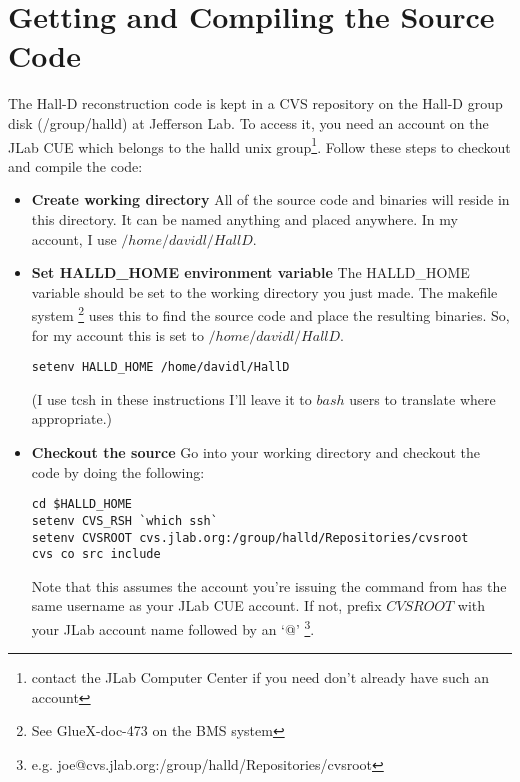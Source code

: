 \documentclass[12pt]{article}
\begin{document}
\section{Getting and Compiling the Source Code}
The Hall-D reconstruction code is kept in a CVS repository on the 
Hall-D group disk (/group/halld) at Jefferson Lab. To access it,
you need an account on the JLab CUE which belongs to the halld unix
group\footnote{contact the JLab Computer Center if you need don't
already have such an account}. Follow these steps to checkout and compile
the code:

\begin{itemize}
	\item{\bf Create working directory} All of the source code and binaries
	will reside in this directory. It can be named anything and placed 
	anywhere. In my account, I use $/home/davidl/HallD$.
	
	\item{\bf Set HALLD\_HOME environment variable} The HALLD\_HOME
	variable should
	be set to the working directory you just made. The makefile system
	\footnote{See GlueX-doc-473 on the BMS system}
	uses this to find the source code and place the resulting binaries.
	So, for my account this is set to $/home/davidl/HallD$.
	
		\begin{lstlisting}[frame=shadowbox,backgroundcolor=\color{cmdbkgd}]
setenv HALLD_HOME /home/davidl/HallD
		\end{lstlisting}

	(I use tcsh in these instructions I'll leave it to $bash$ users to translate
	where appropriate.)

	\item{\bf Checkout the source} Go into
	your working directory and checkout the code by doing the following:
	
		\begin{lstlisting}[frame=shadowbox,backgroundcolor=\color{cmdbkgd}]
cd $HALLD_HOME
setenv CVS_RSH `which ssh`
setenv CVSROOT cvs.jlab.org:/group/halld/Repositories/cvsroot
cvs co src include
		\end{lstlisting}

	Note that this assumes the account you're issuing the command from
	has the same username as your JLab CUE account. If not, prefix
	$CVSROOT$ with your JLab account name followed by an `@'
	\footnote{e.g. joe@cvs.jlab.org:/group/halld/Repositories/cvsroot}.


\end{itemize}
\end{document}
